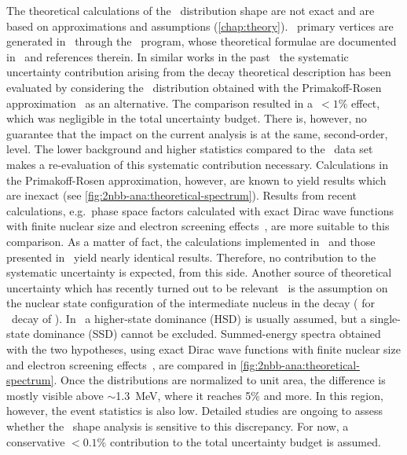 \begin{description}[wide]
  \item[Theoretical \nnbb\ decay model] The theoretical calculations of the \nnbb\
    distribution shape are not exact and are based on approximations and assumptions
    (\cref{chap:theory}).  \nnbb\ primary vertices are generated in \mage\ through the
    \decayzero\ program, whose theoretical formulae are documented
    in~\cite{Ponkratenko2000} and references therein.  In similar works in the
    past~\cite{Agostini2015a, Agostini2012a} the systematic uncertainty contribution
    arising from the decay theoretical description has been evaluated by considering the
    \nnbb\ distribution obtained with the Primakoff-Rosen
    approximation~\cite{Primakoff1959} as an alternative. The comparison resulted in
    a~$<1$\% effect, which was negligible in the total uncertainty budget.  There is,
    however, no guarantee that the impact on the current analysis is at the same,
    second-order, level. The lower background and higher statistics compared to the
    \phaseone\ data set makes a re-evaluation of this systematic contribution necessary.
    Calculations in the Primakoff-Rosen approximation, however, are known to yield results
    which are inexact (see \cref{fig:2nbb-ana:theoretical-spectrum}). Results from recent
    calculations, e.g.~phase space factors calculated with exact Dirac wave functions with
    finite nuclear size and electron screening effects~\cite{Kotila2012}, are more
    suitable to this comparison. As a matter of fact, the calculations implemented in
    \decayzero\ and those presented in~\cite{Kotila2012} yield nearly identical results.
    Therefore, no contribution to the systematic uncertainty is expected, from this side.
    \newpar
    Another source of theoretical uncertainty which has recently turned out to be
    relevant~\cite{Arnold2019, Azzolini2019a} is the assumption on the nuclear state
    configuration of the intermediate nucleus in the decay (\nuc{As}{76} for \nnbb\ decay
    of \gesix). In \gesix\ a higher-state dominance (HSD) is usually assumed, but a
    single-state dominance (SSD) cannot be excluded. Summed-energy spectra obtained with
    the two hypotheses, using exact Dirac wave functions with finite nuclear size and
    electron screening effects~\cite{Kotila2012}, are compared in
    \cref{fig:2nbb-ana:theoretical-spectrum}. Once the distributions are normalized to
    unit area, the difference is mostly visible above $\sim$1.3~MeV, where it reaches 5\%
    and more. In this region, however, the event statistics is also low. Detailed studies
    are ongoing to assess whether the \nnbb\ shape analysis is sensitive to this
    discrepancy. For now, a conservative $<0.1$\% contribution to the total uncertainty
    budget is assumed.


\end{description}
